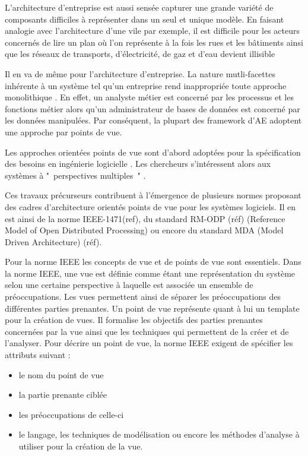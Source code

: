 L'architecture d'entreprise est aussi sensée capturer une grande variété de composants difficiles à représenter dans un seul et unique modèle. 
En faisant analogie avec l'architecture d'une vile par exemple, il est difficile pour les acteurs concernés de lire un plan où l'on représente à la fois les rues et les bâtiments ainsi que les réseaux de transports, d'électricité, de gaz et d'eau devient illisible 

Il en va de même pour l'architecture d'entreprise. La nature mutli-facettes inhérente à un système tel qu'un entreprise rend inappropriée toute approche monolithique \cite{armour1999bigpicture}. En effet, un analyste métier est concerné par les 
processus et les fonctions métier alors qu'un administrateur de bases de données 
est concerné par les données manipulées. Par conséquent, la plupart des 
framework d'AE adoptent une approche par points de vue.

Les approches orientées points de vue sont d'abord adoptées pour la 
spécification des besoins en ingénierie logicielle \cite{mullery1979core}. Les 
chercheurs s'intéressent alors aux systèmes à "~perspectives multiples~" 
\cite{finkelstein1992viewpoints} \cite{kotonya1996requirements} 
\cite{nuseibeh1994multi} \cite{meyers1993representing}. 

Ces travaux précurseurs contribuent à l'émergence de plusieurs normes proposant 
des cadres d'architecture orientés points de vue pour les systèmes logiciels. Il 
en est ainsi de la norme IEEE-1471(ref), du standard RM-ODP (réf) (Reference 
Model of Open Distributed Processing) ou encore du standard MDA (Model Driven 
Architecture) (réf).

Pour la norme IEEE les concepts de vue et de points de vue sont 
essentiels. 
Dans la norme IEEE, une vue est définie comme étant une représentation du système selon une certaine perspective à laquelle est associée un ensemble de préoccupations. Les vues 
permettent ainsi de séparer les préoccupations des différentes parties 
prenantes. Un point de vue représente quant à lui un template pour la création de 
vues. Il formalise les objectifs des parties prenantes concernées par la vue 
ainsi que les techniques qui permettent de la créer et de l'analyser. Pour 
décrire un point de vue, la norme IEEE exigent de spécifier les attributs 
suivant :
\begin{itemize}
\item le nom du point de vue
\item la partie prenante ciblée
\item les préoccupations de celle-ci
\item le langage, les techniques de modélisation ou encore les méthodes 
d'analyse à utiliser pour la création de la vue. 
\end{itemize}

